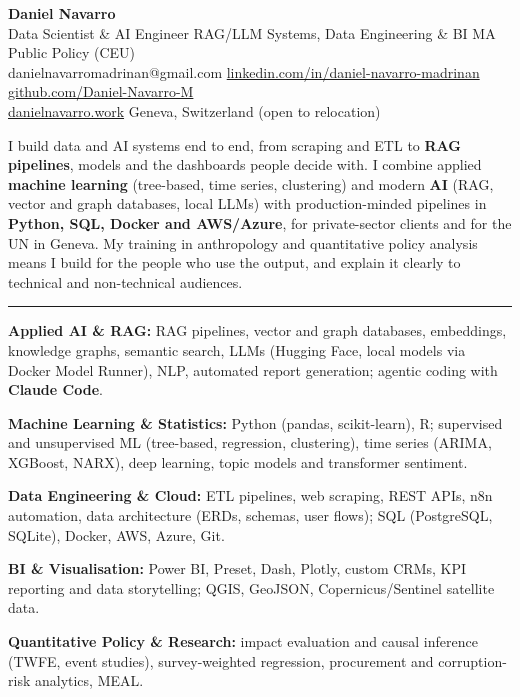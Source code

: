 \documentclass[11pt,a4paper]{article}
\newcommand{\cvsection}[1]{\vspace{5pt}{\centering\textbf{\large \MakeUppercase{#1}}\par}\vspace{2pt}\hrule\vspace{4pt}}
\begin{document}
{\centering
{\LARGE\bfseries Daniel Navarro}\\[3pt]
{Data Scientist \& AI Engineer \textbar{} RAG/LLM Systems, Data Engineering \& BI \textbar{} MA Public Policy (CEU)}\\[3pt]
{\small danielnavarromadrinan@gmail.com \textbar{} \href{https://www.linkedin.com/in/daniel-navarro-madrinan/}{linkedin.com/in/daniel-navarro-madrinan} \textbar{} \href{https://github.com/Daniel-Navarro-M}{github.com/Daniel-Navarro-M}}\\[1pt]
{\small \href{https://danielnavarro.work/}{danielnavarro.work} \textbar{} Geneva, Switzerland (open to relocation)}\par}
\vspace{4pt}

I build data and AI systems end to end, from scraping and ETL to \textbf{RAG pipelines}, models and the dashboards people decide with. I combine applied \textbf{machine learning} (tree-based, time series, clustering) and modern \textbf{AI} (RAG, vector and graph databases, local LLMs) with production-minded pipelines in \textbf{Python, SQL, Docker and AWS/Azure}, for private-sector clients and for the UN in Geneva. My training in anthropology and quantitative policy analysis means I build for the people who use the output, and explain it clearly to technical and non-technical audiences.

\cvsection{Core Competencies}
\textbf{Applied AI \& RAG:} RAG pipelines, vector and graph databases, embeddings, knowledge graphs, semantic search, LLMs (Hugging Face, local models via Docker Model Runner), NLP, automated report generation; agentic coding with \textbf{Claude Code}.

\smallskip
\textbf{Machine Learning \& Statistics:} Python (pandas, scikit-learn), R; supervised and unsupervised ML (tree-based, regression, clustering), time series (ARIMA, XGBoost, NARX), deep learning, topic models and transformer sentiment.

\smallskip
\textbf{Data Engineering \& Cloud:} ETL pipelines, web scraping, REST APIs, n8n automation, data architecture (ERDs, schemas, user flows); SQL (PostgreSQL, SQLite), Docker, AWS, Azure, Git.

\smallskip
\textbf{BI \& Visualisation:} Power BI, Preset, Dash, Plotly, custom CRMs, KPI reporting and data storytelling; QGIS, GeoJSON, Copernicus/Sentinel satellite data.

\smallskip
\textbf{Quantitative Policy \& Research:} impact evaluation and causal inference (TWFE, event studies), survey-weighted regression, procurement and corruption-risk analytics, MEAL.
\end{document}
